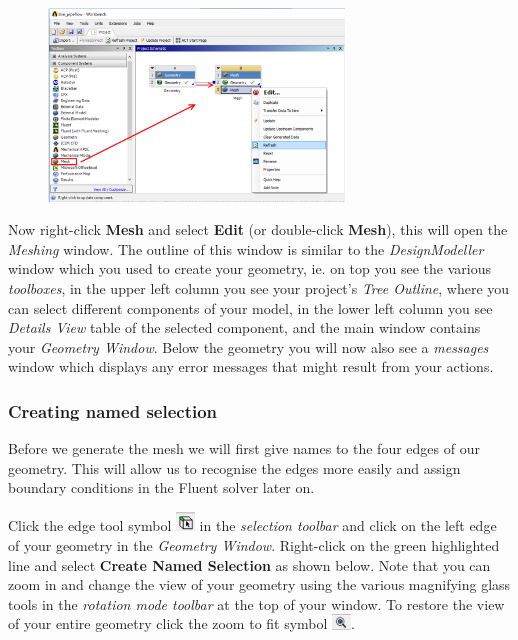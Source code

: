 \documentclass[11pt,a4paper,oneside,hidelinks]{scrartcl}
\newcommand\bfr[1]{\textcolor[rgb]{1,0.00,0.00}{\textbf{\textsf{#1}}}}
\begin{document}
\begin{figure}[H]
\begin{center}
\includegraphics[width=0.7\textwidth,clip]{Mesh_workbench.png}
\end{center}
\end{figure}

Now right-click \bfr{Mesh} and select \bfr{Edit} (or double-click \bfr{Mesh}), this will open the \emph{Meshing} window. The outline of this window is similar to the \emph{DesignModeller} window which you used to create your geometry, ie. on top you see the various \emph{toolboxes}, in the upper left column you see your project's \emph{Tree Outline}, where you can select different components of your model, in the lower left column you see \emph{Details View} table of the selected component, and the main window contains your \emph{Geometry Window}. Below the geometry you will now also see a \emph{messages} window which displays any error messages that might result from your actions.

\subsubsection{Creating named selection}

Before we generate the mesh we will first give names to the four edges of our geometry. This will allow us to recognise the edges more easily and assign boundary conditions in the Fluent solver later on.

Click the edge tool symbol \includegraphics[width=0.5cm]{edge_tool.png} in the \emph{selection toolbar} and click on the left edge of your geometry in the \emph{Geometry Window}. Right-click on the green highlighted line and select \bfr{Create Named Selection} as shown below. Note that you can zoom in and change the view of your geometry using the various magnifying glass tools in the \emph{rotation mode toolbar} at the top of your window. To restore the view of your entire geometry click the zoom to fit symbol \includegraphics[width=0.5cm]{zoom_to_fit.png}.
\end{document}
